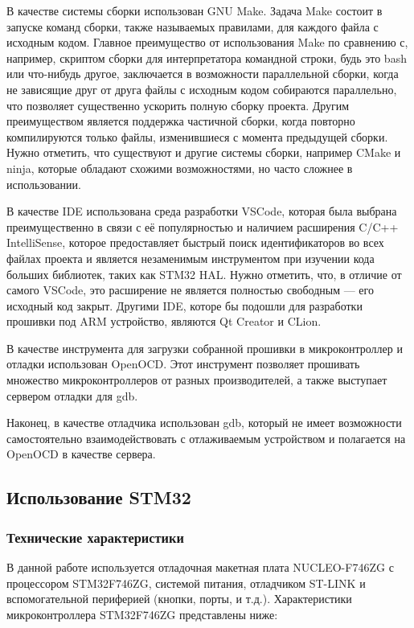 \documentclass[rusmathsym, eqnumwithinsec, amspack, hyperref]{bomgost}
\begin{document}
В качестве системы сборки использован GNU Make. Задача Make состоит в запуске команд сборки, также называемых правилами, для каждого файла с исходным кодом. Главное преимущество от использования Make по сравнению с, например, скриптом сборки для интерпретатора командной строки, будь это bash или что-нибудь другое, заключается в возможности параллельной сборки, когда не зависящие друг от друга файлы с исходным кодом собираются параллельно, что позволяет существенно ускорить полную сборку проекта. Другим преимуществом является поддержка частичной сборки, когда повторно компилируются только файлы, изменившиеся с момента предыдущей сборки. Нужно отметить, что существуют и другие системы сборки, например CMake и ninja, которые обладают схожими возможностями, но часто сложнее в использовании.

В качестве IDE использована среда разработки VSCode, которая была выбрана преимущественно в связи с её популярностью и наличием расширения C/C++ IntelliSense, которое предоставляет быстрый поиск идентификаторов во всех файлах проекта и является незаменимым инструментом при изучении кода больших библиотек, таких как STM32 HAL. Нужно отметить, что, в отличие от самого VSCode, это расширение не является полностью свободным --- его исходный код закрыт. Другими IDE, которе бы подошли для разработки прошивки под ARM устройство, являются Qt Creator и CLion.

В качестве инструмента для загрузки собранной прошивки в микроконтроллер и отладки использован OpenOCD. Этот инструмент позволяет прошивать множество микроконтроллеров от разных производителей, а также выступает сервером отладки для gdb.

Наконец, в качестве отладчика использован gdb, который не имеет возможности самостоятельно взаимодействовать с отлаживаемым устройством и полагается на OpenOCD в качестве сервера.

\subsection{Использование STM32}

\subsubsection{Технические характеристики}

В данной работе используется отладочная макетная плата NUCLEO-F746ZG с процессором STM32F746ZG, системой питания, отладчиком ST-LINK и вспомогательной периферией (кнопки, порты, и т.д.). Характеристики микроконтроллера STM32F746ZG представлены ниже:
\end{document}
